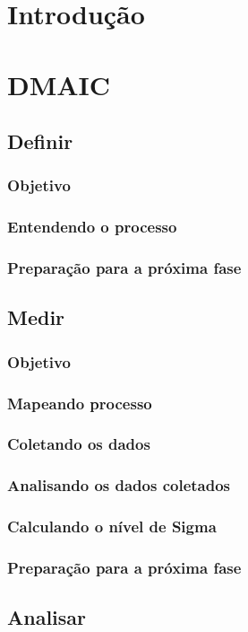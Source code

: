 \documentclass{abnt}
\begin{document}
		\section {Introdução}
			\section {DMAIC}
				\subsection {Definir}
					\subsubsection {Objetivo}
					\subsubsection {Entendendo o processo}
					\subsubsection {Preparação para a próxima fase}
				\subsection {Medir}
					\subsubsection {Objetivo}
					\subsubsection {Mapeando processo}
					\subsubsection {Coletando os dados}
					\subsubsection {Analisando os dados coletados}
					\subsubsection {Calculando o nível de Sigma}
					\subsubsection {Preparação para a próxima fase}
				\subsection {Analisar}
\end{document}
